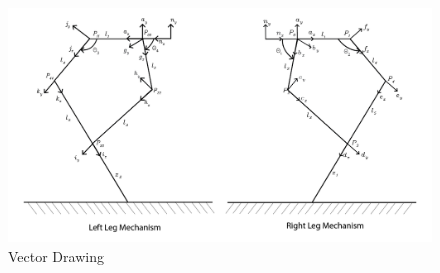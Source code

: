 \documentclass[12pt]{article}
\begin{document}
    

    \begin{figure}[H]
    \centering
    \includegraphics[scale=0.5]{figures/vecdiagram.png}
    \caption{Vector Drawing}
    \label{fig:mechanism}
    \end{figure}
    
    
    
\end{document}
